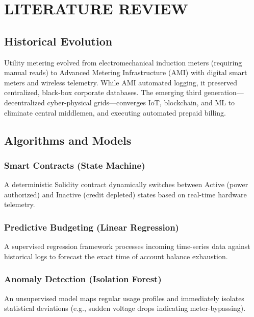 \chapter{LITERATURE REVIEW}
\section{Historical Evolution}
Utility metering evolved from electromechanical induction meters (requiring manual reads) to Advanced Metering Infrastructure (AMI) with digital smart meters and wireless telemetry. While AMI automated logging, it preserved centralized, black-box corporate databases. The emerging third generation—decentralized cyber-physical grids—converges IoT, blockchain, and ML to eliminate central middlemen, and executing automated prepaid billing.
\section{Algorithms and Models}
\subsection{Smart Contracts (State Machine)}
A deterministic Solidity contract dynamically switches between Active (power authorized) and Inactive (credit depleted) states based on real-time hardware telemetry.
\subsection{Predictive Budgeting (Linear Regression)}    
A supervised regression framework processes incoming time-series data against historical logs to forecast the exact time of account balance exhaustion.
\subsection{Anomaly Detection (Isolation Forest)}    
An unsupervised model maps regular usage profiles and immediately isolates statistical deviations (e.g., sudden voltage drops indicating meter-bypassing).

